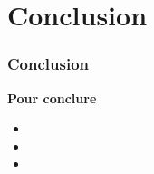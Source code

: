 \documentclass{beamer}
\begin{document}
\section{Conclusion}
%
%
\begin{frame}
  \frametitle{Conclusion}
  \textbf{Pour conclure}
  \begin{itemize}
    \item
    \item
    \item
  \end{itemize}
\end{frame}
%
%
\end{document}
